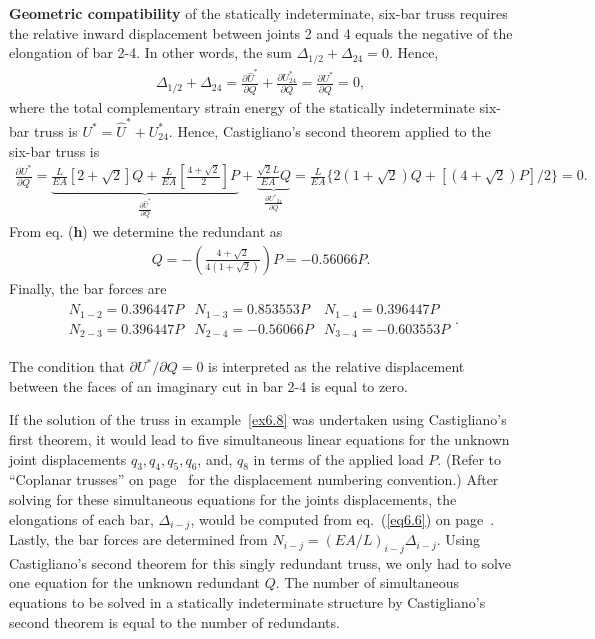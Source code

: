 \documentclass{AeroStructure-ERJohnson}
\begin{document}
\begin{example}
\textbf{Geometric compatibility} of the statically indeterminate, six-bar truss requires the relative inward displacement between joints 2 and 4 equals the negative of the elongation of bar 2-4. In other words, the sum $\Delta_{1 / 2}+\Delta_{24}=0$. Hence,
\begin{align}
\Delta_{1 / 2}+\Delta_{24}=\frac{\partial \hat{U}^{*}}{\partial Q}+\frac{\partial U_{24}^{*}}{\partial Q}=\frac{\partial U^{*}}{\partial Q}=0,
\end{align}
where the total complementary strain energy of the statically indeterminate six-bar truss is $U^{*}=\hat{U}^{*}+U^{*}_{24}$. Hence, Castigliano's second theorem applied to the six-bar truss is
\begin{align}
\frac{\partial U^{*}}{\partial Q}=\underbrace{\frac{L}{E A}[2+\sqrt{2}] Q+\frac{L}{E A}\left[\frac{4+\sqrt{2}}{2}\right] P}_{\frac{\partial \hat{U}^{*}}{\partial Q}}+\underbrace{\frac{\sqrt{2} L}{E A} Q}_{\frac{\partial U^{*}{ }_{24}}{\partial Q}}=\frac{L}{E A}\{2(1+\sqrt{2}) Q+[(4+\sqrt{2}) P] / 2\}=0.
\end{align}
From eq. (\textbf{h}) we determine the redundant as
\begin{align}
Q=-\left(\frac{4+\sqrt{2}}{4(1+\sqrt{2})}\right) P=-0.56066 P.
\end{align}
Finally, the bar forces are
\begin{align}
\begin{array}{crrr}N_{1-2}=0.396447 P & N_{1-3}=0.853553 P & N_{1-4}=0.396447 P \\N_{2-3}=0.396447 P & N_{2-4}=-0.56066 P & N_{3-4}=-0.603553 P\end{array}.
\end{align}

\vspace*{-1pc}

The condition that $\partial U^{*} / \partial Q=0$ is interpreted as the relative displacement between the faces of an imaginary cut in bar 2-4 is equal to zero.
\end{example}

\vspace*{-1.5pc}

If the solution of the truss in example~\ref{ex6.8} was undertaken using Castigliano's first theorem, it would lead to five simultaneous linear equations for the unknown joint displacements $q_{3}, q_{4}, q_{5}, q_{6}$, and, $q_{8}$ in terms of the applied load $P$. (Refer to ``Coplanar trusses'' on page~\pageref{sec6.1} for the displacement numbering convention.) After solving for these simultaneous equations for the joints displacements, the elongations of each bar, $\Delta_{i-j}$, would be computed from eq.~(\ref{eq6.6}) on page~\pageref{eq6.6}. Lastly, the bar forces are determined from $N_{i-j}=(E A / L)_{i-j} \Delta_{i-j}$. Using Castigliano's second theorem for this singly redundant truss, we only had to solve one equation for the unknown redundant $Q$. The number of simultaneous equations to be solved in a statically indeterminate structure by Castigliano's second theorem is equal to the number of redundants.
\end{document}
